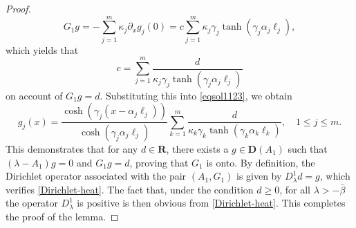 \documentclass[a4paper,11pt,reqno]{amsart}
\def\la{\lambda}
\def\R{\mathbf{R}}
\theoremstyle{plain}
\numberwithin{equation}{section}
\begin{document}
\begin{proof}
\begin{equation*}
G_1 g = -\sum_{j=1}^m \kappa_j \partial_x g_j(0) = c \sum_{j=1}^m \kappa_j \gamma_j \tanh(\gamma_j \alpha_j \ell_j),
\end{equation*}
which yields that
\begin{equation*}
c=\sum_{j=1}^m\frac{d}{ \kappa_j \gamma_j \tanh(\gamma_j \alpha_j \ell_j)}
\end{equation*}
on account of $G_1g=d$. Substituting this into \eqref{eqsol1123}, we obtain
\begin{equation*}
g_j(x) = \frac{\cosh(\gamma_j (x-\alpha_j \ell_j))}{\cosh(\gamma_j \alpha_j \ell_j)}\sum_{k=1}^m\frac{d}{ \kappa_k \gamma_k \tanh(\gamma_k \alpha_k \ell_k)},\quad 1 \le j\le m.
\end{equation*}
This demonstrates that for any $d \in \R$, there exists a $g \in \bm{D}(A_1)$ such that $(\lambda - A_1)g = 0$ and $G_1 g = d$, proving that $G_1$ is onto. By definition, the Dirichlet operator associated with the pair $(A_1,G_1)$ is given by $D_\lambda^1 d = g$, which verifies \eqref{Dirichlet-heat}. The fact that, under the condition $d\ge 0$, for all $\lambda>-\bar{\beta}$ the operator $D_\la^1$ is positive is then obvious from \eqref{Dirichlet-heat}. This completes the proof of the lemma.
\end{proof}
\end{document}
